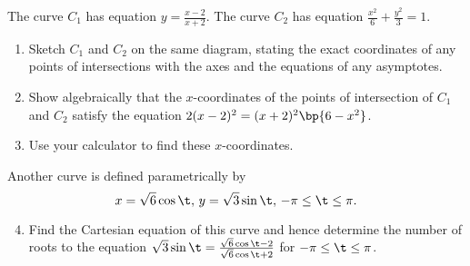 \begin{problem}
    The curve $C_1$ has equation $y = \frac{x-2}{x+2}$. The curve $C_2$ has equation $\frac{x^2}6 + \frac{y^2}3 = 1$.

    \begin{enumerate}
        \item Sketch $C_1$ and $C_2$ on the same diagram, stating the exact coordinates of any points of intersections with the axes and the equations of any asymptotes.
        \item Show algebraically that the $x$-coordinates of the points of intersection of $C_1$ and $C_2$ satisfy the equation $2(x-2)^2 = (x+2)^2\bp{6-x^2}$.
        \item Use your calculator to find these $x$-coordinates.
    \end{enumerate}

    Another curve is defined parametrically by \[x = \sqrt6 \cos\t, \, y = \sqrt3 \sin\t, \, -\pi \leq \t \leq \pi.\]

    \begin{enumerate}
        \setcounter{enumi}{3}
        \item Find the Cartesian equation of this curve and hence determine the number of roots to the equation $\sqrt3 \sin\t = \frac{\sqrt6 \cos\t -2}{\sqrt6 \cos\t+2}$ for $-\pi \leq \t \leq \pi$.
    \end{enumerate}
\end{problem}

